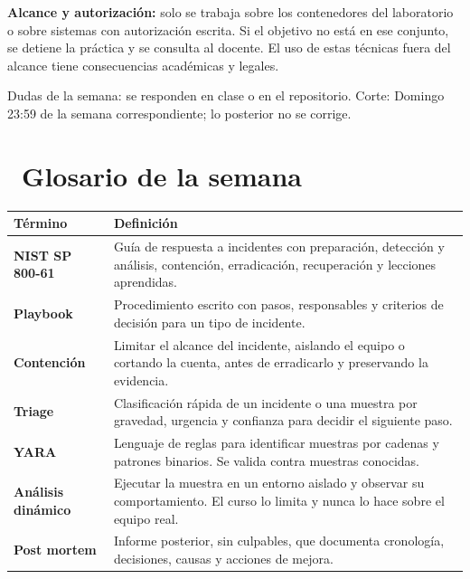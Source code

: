 \documentclass[11pt,a4paper]{article}
\newcommand{\iconotexto}[2]{\textcolor{cyanNeon}{\faIcon{#1}}~#2}
\begin{document}
\begin{tcolorbox}[cajaMejora]\textbf{Alcance y autorización:} solo se trabaja sobre los contenedores del laboratorio o sobre sistemas con autorización escrita. Si el objetivo no está en ese conjunto, se detiene la práctica y se consulta al docente. El uso de estas técnicas fuera del alcance tiene consecuencias académicas y legales.
\end{tcolorbox}

\begin{cajaRecuerda}Dudas de la semana: se responden en clase o en el repositorio. Corte: Domingo 23:59 de la semana correspondiente; lo posterior no se corrige.
\end{cajaRecuerda}

\clearpage

\section{\iconotexto{book}{Glosario de la semana}}

\small
\begin{longtable}{@{}>{\raggedright\arraybackslash}p{4.2cm}>{\raggedright\arraybackslash}p{\dimexpr\linewidth-4.2cm-12pt\relax}@{}}
\toprule
\textbf{Término} & \textbf{Definición}\\
\midrule
\endhead
\bottomrule
\endlastfoot
\textbf{NIST SP 800-61} & Guía de respuesta a incidentes con preparación, detección y análisis, contención, erradicación, recuperación y lecciones aprendidas.\\
\textbf{Playbook} & Procedimiento escrito con pasos, responsables y criterios de decisión para un tipo de incidente.\\
\textbf{Contención} & Limitar el alcance del incidente, aislando el equipo o cortando la cuenta, antes de erradicarlo y preservando la evidencia.\\
\textbf{Triage} & Clasificación rápida de un incidente o una muestra por gravedad, urgencia y confianza para decidir el siguiente paso.\\
\textbf{YARA} & Lenguaje de reglas para identificar muestras por cadenas y patrones binarios. Se valida contra muestras conocidas.\\
\textbf{Análisis dinámico} & Ejecutar la muestra en un entorno aislado y observar su comportamiento. El curso lo limita y nunca lo hace sobre el equipo real.\\
\textbf{Post mortem} & Informe posterior, sin culpables, que documenta cronología, decisiones, causas y acciones de mejora.\\
\end{longtable}
\end{document}
